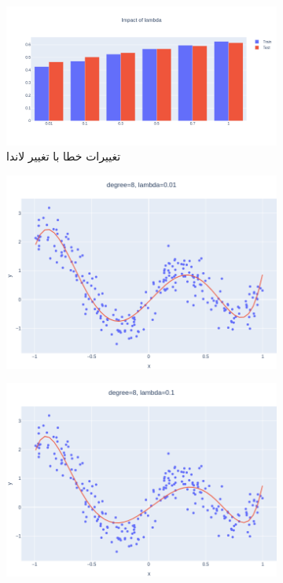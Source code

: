\documentclass[14pt,a4]{article}
\begin{document}
\begin{figure}[h]
    \centering
    \begin{subfigure}{\linewidth}
        \centering
        \includegraphics[width=\textwidth]{images/implementation/q1/part_f.png}
        \caption{تغییرات خطا با تغییر لاندا}
        \label{implementation-q1p6-top}
    \end{subfigure}
    \newline
    \begin{subfigure}{0.3\linewidth}
        \centering
        \includegraphics[width=\textwidth]{images/implementation/q1/part_e/0.01.png}
    \end{subfigure}
    \hfill
    \begin{subfigure}{0.3\textwidth}
        \centering
        \includegraphics[width=\textwidth]{images/implementation/q1/part_e/0.1.png}

\end{subfigure}
\end{figure}
\end{document}
